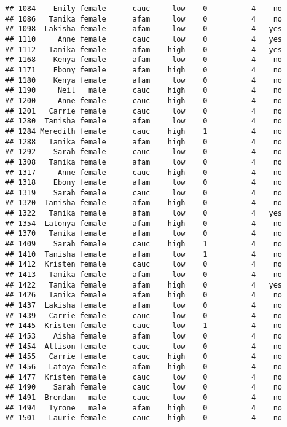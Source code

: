 \documentclass[
]{article}
\begin{document}
\begin{verbatim}
## 1084    Emily female      cauc     low    0          4    no
## 1086   Tamika female      afam     low    0          4    no
## 1098  Lakisha female      afam     low    0          4   yes
## 1110     Anne female      cauc     low    0          4   yes
## 1112   Tamika female      afam    high    0          4   yes
## 1168    Kenya female      afam     low    0          4    no
## 1171    Ebony female      afam    high    0          4    no
## 1180    Kenya female      afam     low    0          4    no
## 1190     Neil   male      cauc    high    0          4    no
## 1200     Anne female      cauc    high    0          4    no
## 1201   Carrie female      cauc     low    0          4    no
## 1280  Tanisha female      afam     low    0          4    no
## 1284 Meredith female      cauc    high    1          4    no
## 1288   Tamika female      afam    high    0          4    no
## 1292    Sarah female      cauc     low    0          4    no
## 1308   Tamika female      afam     low    0          4    no
## 1317     Anne female      cauc    high    0          4    no
## 1318    Ebony female      afam     low    0          4    no
## 1319    Sarah female      cauc     low    0          4    no
## 1320  Tanisha female      afam    high    0          4    no
## 1322   Tamika female      afam     low    0          4   yes
## 1354  Latonya female      afam    high    0          4    no
## 1370   Tamika female      afam     low    0          4    no
## 1409    Sarah female      cauc    high    1          4    no
## 1410  Tanisha female      afam     low    1          4    no
## 1412  Kristen female      cauc     low    0          4    no
## 1413   Tamika female      afam     low    0          4    no
## 1422   Tamika female      afam    high    0          4   yes
## 1426   Tamika female      afam    high    0          4    no
## 1437  Lakisha female      afam     low    0          4    no
## 1439   Carrie female      cauc     low    0          4    no
## 1445  Kristen female      cauc     low    1          4    no
## 1453    Aisha female      afam     low    0          4    no
## 1454  Allison female      cauc     low    0          4    no
## 1455   Carrie female      cauc    high    0          4    no
## 1456   Latoya female      afam    high    0          4    no
## 1477  Kristen female      cauc     low    0          4    no
## 1490    Sarah female      cauc     low    0          4    no
## 1491  Brendan   male      cauc     low    0          4    no
## 1494   Tyrone   male      afam    high    0          4    no
## 1501   Laurie female      cauc    high    0          4    no

\end{verbatim}
\end{document}
